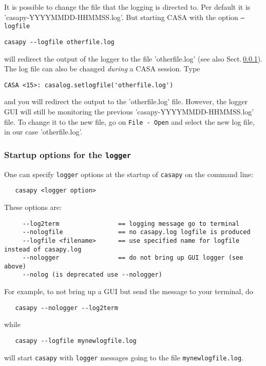 It is possible to change the file that the logging is directed to. Per
default it is 'casapy-YYYYMMDD-HHMMSS.log'. But starting CASA with the option {\tt --logfile} 

\small
\begin{verbatim}
casapy --logfile otherfile.log
\end{verbatim}
\normalsize 

will redirect the output of the logger to the file 'otherfile.log'
(see also Sect.\,\ref{section:intro.common.logger.startup}).
The log file can also be changed {\it during} a CASA session. Type 
\small
\begin{verbatim}
CASA <15>: casalog.setlogfile('otherfile.log')
\end{verbatim}
\normalsize 

and you will redirect the output to the 'otherfile.log' file.
However, the logger GUI will still be monitoring the previous
'casapy-YYYYMMDD-HHMMSS.log' file. To change it to the new file, go on {\tt File -
 Open} and select the new log file, in our case 'otherfile.log'.

\subsubsection{Startup options for the {\tt logger}}
\label{section:intro.common.logger.startup}

One can specify {\tt logger} options at the startup of {\tt casapy} on
the command line:
\small
\begin{verbatim}
   casapy <logger option>
\end{verbatim}
\normalsize

These options are:
\small
\begin{verbatim}
     --log2term                == logging message go to terminal
     --nologfile               == no casapy.log logfile is produced
     --logfile <filename>      == use specified name for logfile instead of casapy.log
     --nologger                == do not bring up GUI logger (see above)
     --nolog (is deprecated use --nologger)
\end{verbatim}
\normalsize
For example, to not bring up a GUI but send the message to your
terminal, do
\small
\begin{verbatim}
   casapy --nologger --log2term
\end{verbatim}
\normalsize
while
\small
\begin{verbatim}
   casapy --logfile mynewlogfile.log
\end{verbatim}
\normalsize
will start {\tt casapy} with {\tt logger} messages going to the file
{\tt mynewlogfile.log}.


